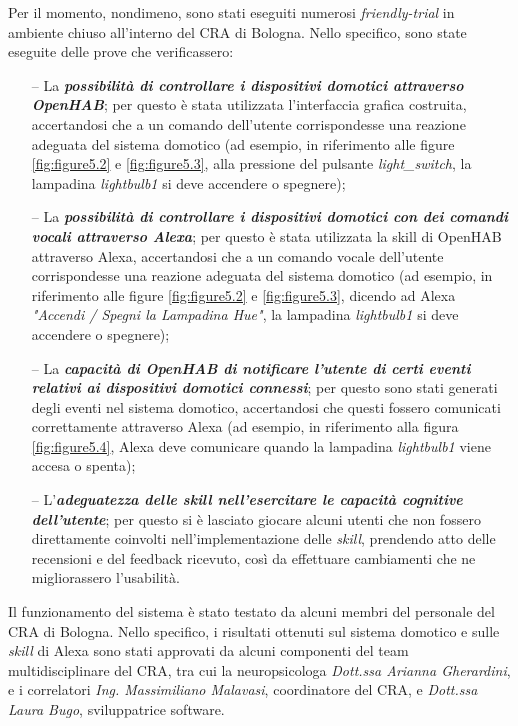 Per il momento, nondimeno, sono stati eseguiti numerosi \textit{friendly-trial}
in ambiente chiuso all’interno del CRA di Bologna. Nello specifico, sono state
eseguite delle prove che verificassero:
\begin{itemize}
  \item[--] La \textit{\textbf{possibilità di controllare i dispositivi
            domotici attraverso OpenHAB}}; per questo è stata utilizzata
        l’interfaccia grafica costruita, accertandosi che a un comando
        dell'utente corrispondesse una reazione adeguata del sistema
        domotico (ad esempio, in riferimento alle figure
        \ref{fig:figure5.2} e \ref{fig:figure5.3}, alla pressione del
        pulsante \textit{light\_switch}, la lampadina \textit{lightbulb1}
        si deve accendere o spegnere);
  \item[--] La \textit{\textbf{possibilità di controllare i dispositivi
            domotici con dei comandi vocali attraverso Alexa}}; per questo è
        stata utilizzata la skill di OpenHAB attraverso Alexa, accertandosi che
        a un comando vocale dell'utente corrispondesse una reazione adeguata
        del sistema domotico (ad esempio, in riferimento alle figure
        \ref{fig:figure5.2} e \ref{fig:figure5.3}, dicendo ad Alexa
        \textit{"Accendi / Spegni la Lampadina Hue"}, la lampadina
        \textit{lightbulb1} si deve accendere o spegnere);
  \item[--] La \textit{\textbf{capacità di OpenHAB di notificare l’utente di
            certi eventi relativi ai dispositivi domotici connessi}}; per
        questo sono stati generati degli eventi nel sistema domotico,
        accertandosi che questi fossero comunicati correttamente attraverso
        Alexa (ad esempio, in riferimento alla figura \ref{fig:figure5.4},
        Alexa deve comunicare quando la lampadina \textit{lightbulb1} viene
        accesa o spenta);
  \item[--] L'\textit{\textbf{adeguatezza delle skill nell’esercitare le
            capacità cognitive dell’utente}}; per questo si è lasciato giocare
        alcuni utenti che non fossero direttamente coinvolti
        nell'implementazione delle \textit{skill}, prendendo atto delle
        recensioni e del feedback ricevuto, così da effettuare cambiamenti che
        ne migliorassero l'usabilità.
\end{itemize}
Il funzionamento del sistema è stato testato da alcuni membri del personale del
CRA di Bologna. Nello specifico, i risultati ottenuti sul sistema domotico e
sulle \textit{skill} di Alexa sono stati approvati da alcuni componenti del
team multidisciplinare del CRA, tra cui la neuropsicologa \textit{Dott.ssa
  Arianna Gherardini}, e i correlatori \textit{Ing. Massimiliano Malavasi},
coordinatore del CRA, e \textit{Dott.ssa Laura Bugo}, sviluppatrice software.

